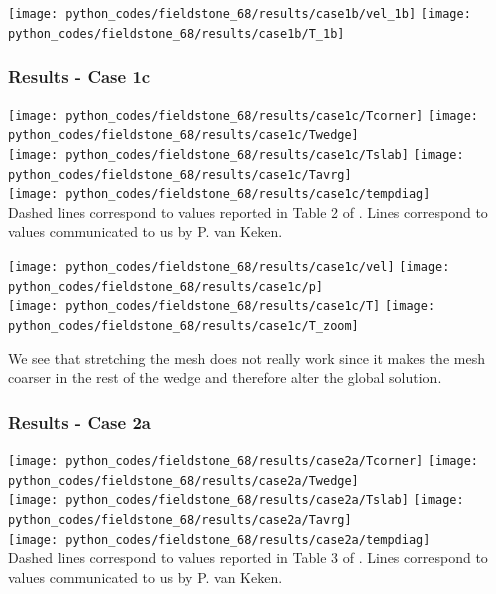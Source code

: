 \begin{center}
\texttt{[image: python\_codes/fieldstone\_68/results/case1b/vel\_1b]}
\texttt{[image: python\_codes/fieldstone\_68/results/case1b/T\_1b]}
\end{center}



\newpage
\subsubsection*{Results - Case 1c}

\begin{center}
\texttt{[image: python\_codes/fieldstone\_68/results/case1c/Tcorner]}
\texttt{[image: python\_codes/fieldstone\_68/results/case1c/Twedge]}\\
\texttt{[image: python\_codes/fieldstone\_68/results/case1c/Tslab]}
\texttt{[image: python\_codes/fieldstone\_68/results/case1c/Tavrg]}\\
\texttt{[image: python\_codes/fieldstone\_68/results/case1c/tempdiag]}\\
{\captionfont Dashed lines correspond to values reported in Table 2 of \cite{vack08}.
Lines correspond to values communicated to us by P. van Keken.}
\end{center}

\begin{center}
\texttt{[image: python\_codes/fieldstone\_68/results/case1c/vel]}
\texttt{[image: python\_codes/fieldstone\_68/results/case1c/p]}\\
\texttt{[image: python\_codes/fieldstone\_68/results/case1c/T]}
\texttt{[image: python\_codes/fieldstone\_68/results/case1c/T\_zoom]}
\end{center}

We see that stretching the mesh does not really work since it makes the mesh coarser in the rest of the wedge and therefore 
alter the global solution.

\newpage
\subsubsection*{Results - Case 2a}

\begin{center}
\texttt{[image: python\_codes/fieldstone\_68/results/case2a/Tcorner]}
\texttt{[image: python\_codes/fieldstone\_68/results/case2a/Twedge]}\\
\texttt{[image: python\_codes/fieldstone\_68/results/case2a/Tslab]}
\texttt{[image: python\_codes/fieldstone\_68/results/case2a/Tavrg]}\\
\texttt{[image: python\_codes/fieldstone\_68/results/case2a/tempdiag]}\\
{\captionfont Dashed lines correspond to values reported in Table 3 of \cite{vack08}.
Lines correspond to values communicated to us by P. van Keken.}
\end{center}

